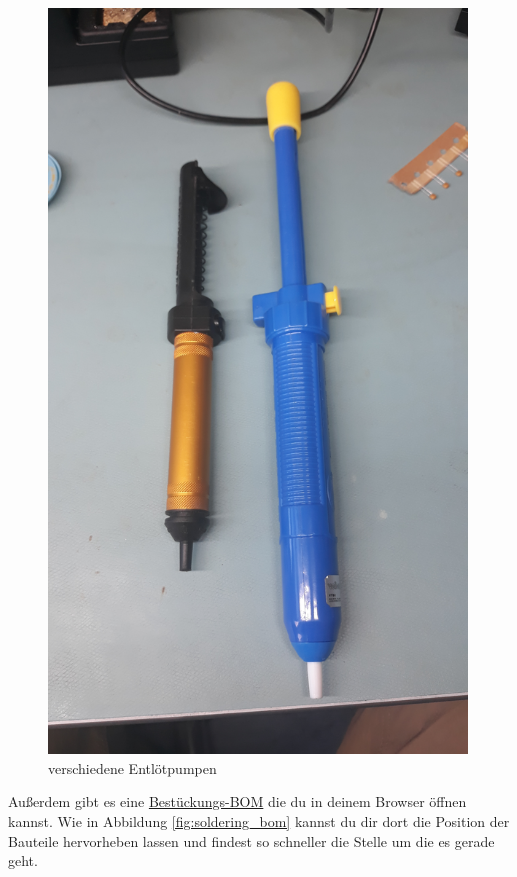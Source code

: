 \documentclass[12pt, a4paper]{article}		%
\begin{document}
\begin{minipage}[t]{0.49\textwidth}
\begin{figure}[H]
	\centering
		\includegraphics[width=0.99\textwidth]{Grafiken/20200726_174356.jpg}
	\caption{verschiedene Entlötpumpen}
	\label{fig:20200726_174356}
\end{figure}
\end{minipage}


Außerdem gibt es eine \href{https://htmlpreview.github.io/?https://github.com/Friends-of-OpenBikeSensor/OpenBikeSensor_PCB_Board/blob/Mit_Verpolschutz/BOM_for_soldering_Rev_0.02.07.html}{Bestückungs-BOM} die du in deinem Browser öffnen kannst. Wie in Abbildung \ref{fig:soldering_bom} kannst du dir dort die Position der Bauteile hervorheben lassen und findest so schneller die Stelle um die es gerade geht.
\end{document}
